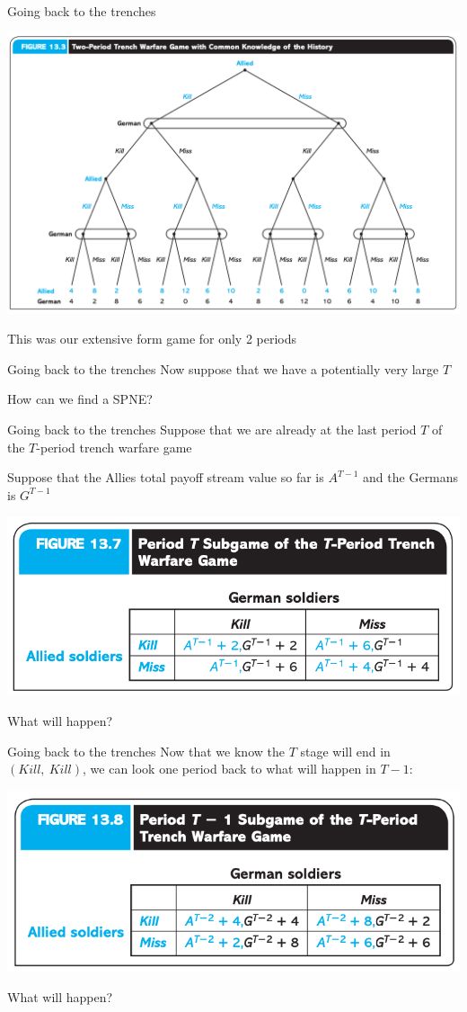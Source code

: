 \begin{frame}{Going back to the trenches}
  \begin{center}
    \includegraphics[width=.8\textwidth]{figures/fig133.png} 
  \end{center}  
  This was our extensive form game for only 2 periods
\end{frame}

\begin{frame}{Going back to the trenches}
  Now suppose that we have a potentially very large $T$

  How can we find a SPNE?

\end{frame}

\begin{frame}{Going back to the trenches}
  Suppose that we are already at the last period $T$ of the $T$-period trench warfare game 

  Suppose that the Allies total payoff stream value so far is $A^{T-1}$ and the Germans is $G^{T-1}$ 
  \begin{center}
    \includegraphics[width=.7\textwidth]{figures/tab137.png} 
  \end{center}
  What will happen?
\end{frame}

\begin{frame}{Going back to the trenches}
  Now that we know the $T$ stage will end in $(Kill, ~Kill)$, we can look one period back to what will happen in $T-1$: 
  \begin{center}
    \includegraphics[width=.7\textwidth]{figures/fig138.png}
  \end{center}
  What will happen?
\end{frame}

